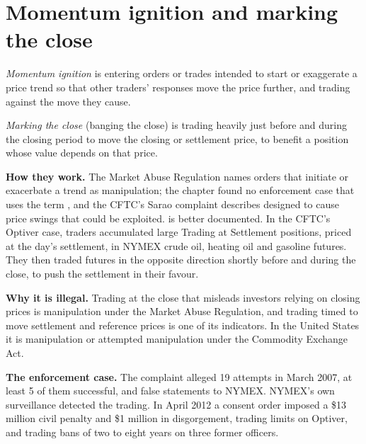 \section{Momentum ignition and marking the close}

\begin{definition}\label{def:s2:manipulative-strategies-and-how-they-are-caught:ignition}
\emph{Momentum ignition} is entering orders or trades intended to start or exaggerate a price trend so that other traders'
responses move the price further, and trading against the move they cause.
\end{definition}

\begin{definition}\label{def:s2:manipulative-strategies-and-how-they-are-caught:close}
\emph{Marking the close} (banging the close) is trading heavily just before and during the closing period to move the
closing or settlement price, to benefit a position whose value depends on that price.
\end{definition}

\textbf{How they work.} The Market Abuse Regulation names orders that initiate or exacerbate a trend as manipulation; the chapter found no enforcement
case that uses the term , and the CFTC's Sarao complaint describes  designed to cause price swings that could be exploited.
 is better documented. In the CFTC's Optiver case, traders accumulated large Trading at Settlement positions, priced at the day's
settlement, in NYMEX crude oil, heating oil and gasoline futures. They then traded futures in the opposite direction shortly before and during the
close, to push the settlement in their favour.

\textbf{Why it is illegal.} Trading at the close that misleads investors relying on closing prices is manipulation under the Market Abuse Regulation,
and trading timed to move settlement and reference prices is one of its indicators. In the United States it is manipulation or attempted manipulation
under the Commodity Exchange Act.

\textbf{The enforcement case.} The complaint alleged 19 attempts in March 2007, at least 5 of them successful, and false statements to NYMEX. NYMEX's
own surveillance detected the trading. In April 2012 a consent order imposed a \$13 million civil penalty and \$1 million in disgorgement, trading
limits on Optiver, and trading bans of two to eight years on three former officers.

